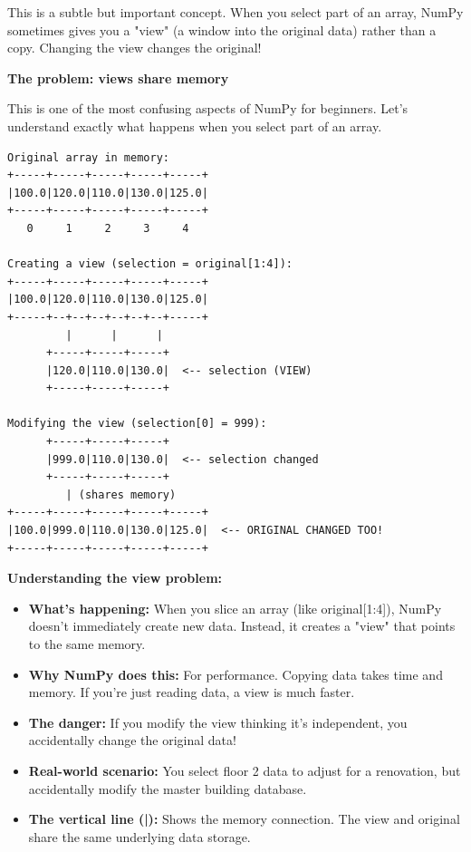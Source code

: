 
This is a subtle but important concept. When you select part of an array, NumPy sometimes gives you a "view" (a window into the original data) rather than a copy. Changing the view changes the original!

\begin{tcolorbox}[
    title=Views vs copies illustrated,
    colframe=purple,
    colback = white,
    arc=2mm,
    breakable
]
\textbf{The problem: views share memory}

This is one of the most confusing aspects of NumPy for beginners. Let's understand exactly what happens when you select part of an array.

\begin{lstlisting}[basicstyle=\ttfamily\footnotesize,breaklines=true,columns=fullflexible,keepspaces=true,xleftmargin=0pt]
Original array in memory:
+-----+-----+-----+-----+-----+
|100.0|120.0|110.0|130.0|125.0|
+-----+-----+-----+-----+-----+
   0     1     2     3     4

Creating a view (selection = original[1:4]):
+-----+-----+-----+-----+-----+
|100.0|120.0|110.0|130.0|125.0|
+-----+--+--+--+--+--+--+-----+
         |      |      |
      +-----+-----+-----+
      |120.0|110.0|130.0|  <-- selection (VIEW)
      +-----+-----+-----+
      
Modifying the view (selection[0] = 999):
      +-----+-----+-----+
      |999.0|110.0|130.0|  <-- selection changed
      +-----+-----+-----+
         | (shares memory)
+-----+-----+-----+-----+-----+
|100.0|999.0|110.0|130.0|125.0|  <-- ORIGINAL CHANGED TOO!
+-----+-----+-----+-----+-----+
\end{lstlisting}

\textbf{Understanding the view problem:}
\begin{itemize}
\item \textbf{What's happening:} When you slice an array (like original[1:4]), NumPy doesn't immediately create new data. Instead, it creates a "view" that points to the same memory.
\item \textbf{Why NumPy does this:} For performance. Copying data takes time and memory. If you're just reading data, a view is much faster.
\item \textbf{The danger:} If you modify the view thinking it's independent, you accidentally change the original data!
\item \textbf{Real-world scenario:} You select floor 2 data to adjust for a renovation, but accidentally modify the master building database.
\item \textbf{The vertical line (|):} Shows the memory connection. The view and original share the same underlying data storage.
\end{itemize}
\vspace{2em}


\end{tcolorbox}
